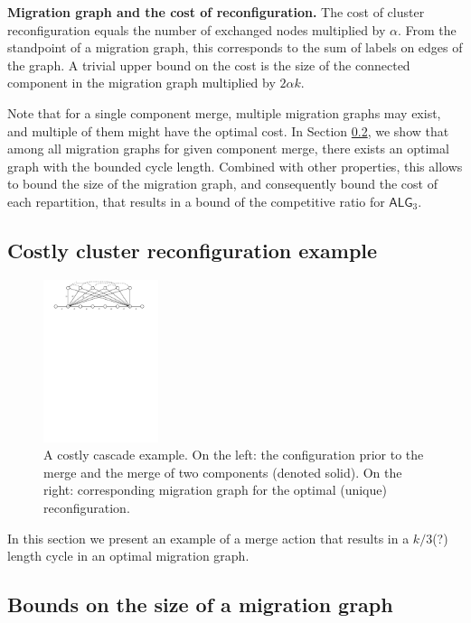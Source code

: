 \documentclass[manuscript,screen=true, review, anonymous]{acmart}
\newcommand{\TAlg}{{\ensuremath{\textsf{ALG}_{3}}}\xspace}
\begin{document}
\noindent
\textbf{Migration graph and the cost of reconfiguration.}
The cost of cluster reconfiguration equals the number of exchanged nodes multiplied by $\alpha$.
From the standpoint of a migration graph, this corresponds to the sum of labels on edges of the graph.
A trivial upper bound on the cost is the size of the connected component in the migration graph multiplied by $2\alpha k$.

\medskip

Note that for a single component merge, multiple migration graphs may exist, and multiple of them might have the optimal cost.
In Section \ref{ssec:cascade}, we show that among all migration graphs for given component merge, there exists an optimal graph with the bounded cycle length.
Combined with other properties, this allows to bound the size of the migration graph, and consequently bound the cost of each repartition, that results in a bound of the competitive ratio for \TAlg.

\subsection{Costly cluster reconfiguration example}
\label{ssec:example}



\begin{figure}[H]
	\centering
	\includegraphics[width=0.3\textwidth]{figs/substitute}
	\caption{A costly cascade example. On the left: the configuration prior to the merge and the merge of two components (denoted solid). On the right: corresponding migration graph for the optimal (unique) reconfiguration.}
\end{figure}


In this section we present an example of a merge action that results in a $k/3$(?) length cycle in an optimal migration graph.

\subsection{Bounds on the size of a migration graph}
\label{ssec:cascade}
\end{document}
